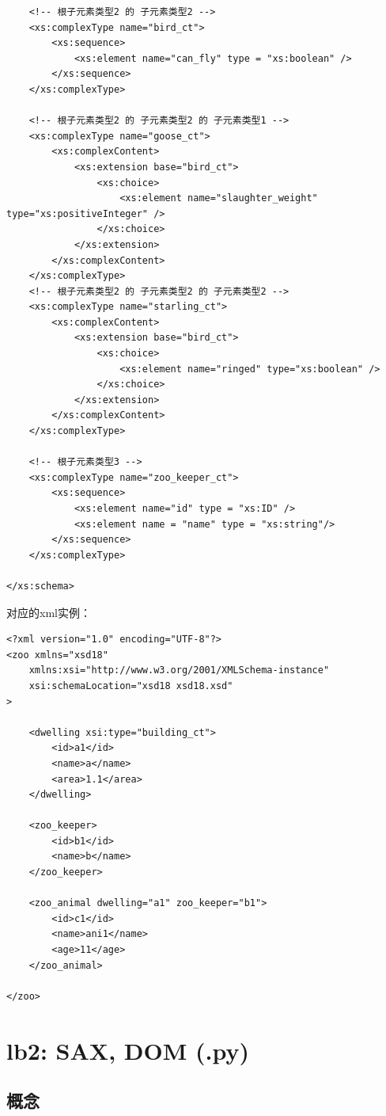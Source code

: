 \documentclass[fontset=windows]{article}
\begin{document}
\begin{verbatim}
    <!-- 根子元素类型2 的 子元素类型2 -->
    <xs:complexType name="bird_ct">
        <xs:sequence>
            <xs:element name="can_fly" type = "xs:boolean" />
        </xs:sequence>
    </xs:complexType>

    <!-- 根子元素类型2 的 子元素类型2 的 子元素类型1 -->
    <xs:complexType name="goose_ct">
        <xs:complexContent>
            <xs:extension base="bird_ct">
                <xs:choice>
                    <xs:element name="slaughter_weight" type="xs:positiveInteger" />
                </xs:choice>
            </xs:extension>
        </xs:complexContent>
    </xs:complexType>
    <!-- 根子元素类型2 的 子元素类型2 的 子元素类型2 -->
    <xs:complexType name="starling_ct">
        <xs:complexContent>
            <xs:extension base="bird_ct">
                <xs:choice>
                    <xs:element name="ringed" type="xs:boolean" />
                </xs:choice>
            </xs:extension>
        </xs:complexContent>
    </xs:complexType>

    <!-- 根子元素类型3 -->
    <xs:complexType name="zoo_keeper_ct">
        <xs:sequence>
            <xs:element name="id" type = "xs:ID" />
            <xs:element name = "name" type = "xs:string"/>
        </xs:sequence>
    </xs:complexType>

</xs:schema>
\end{verbatim}

对应的xml实例：
\begin{verbatim}
<?xml version="1.0" encoding="UTF-8"?>
<zoo xmlns="xsd18"
    xmlns:xsi="http://www.w3.org/2001/XMLSchema-instance"
    xsi:schemaLocation="xsd18 xsd18.xsd"
>

    <dwelling xsi:type="building_ct">
        <id>a1</id>
        <name>a</name>
        <area>1.1</area>
    </dwelling>

    <zoo_keeper>
        <id>b1</id>
        <name>b</name>
    </zoo_keeper>

    <zoo_animal dwelling="a1" zoo_keeper="b1">
        <id>c1</id>
        <name>ani1</name>
        <age>11</age>
    </zoo_animal>

</zoo>
\end{verbatim}


\section{lb2: SAX, DOM (.py)}

\subsection{概念}
\end{document}
